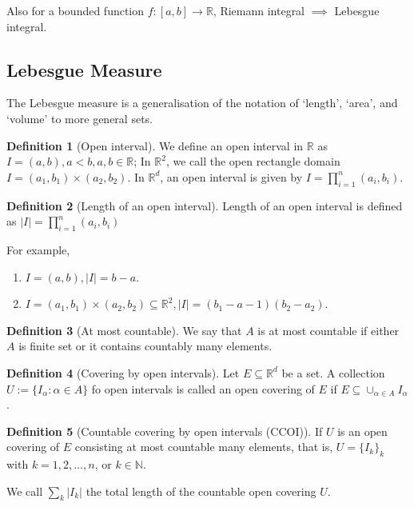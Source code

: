 \documentclass{article}
\theoremstyle{definition}
\newtheorem{definition}{Definition}[section]
\begin{document}
Also for a bounded function $f: [a,b]\to \mathbb{R}$, Riemann integral $\implies$ Lebesgue integral.

\subsection{Lebesgue Measure}

The Lebesgue measure is a generalisation of the notation of `length', `area', and `volume' to more general sets.
\begin{definition}[Open interval]
We define an open interval in $\mathbb{R}$ as $I=(a,b),a<b,a,b \in \mathbb{R}$; In $\mathbb{R}^2$, we call the open rectangle domain $I=(a_1,b_1)\times(a_2,b_2)$. In $\mathbb{R}^d$, an open interval is given by $I=\prod_{i=1}^n(a_i,b_i)$.
\end{definition}
\begin{definition}[Length of an open interval]
Length of an open interval is defined as $|I|=\prod_{i=1}^n(a_i,b_i)$
\end{definition}

For example, 

\begin{enumerate}
	\item $I=(a,b), |I|=b-a$.
	\item $I=(a_1,b_1)\times(a_2,b_2) \subseteq \mathbb{R}^2, |I|=(b_1-a-1)(b_2-a_2)$.
\end{enumerate}


\begin{definition}[At most countable]
We say that $A$ is at most countable if either $A$ is finite set or it contains countably many elements.
\end{definition}

\begin{definition}[Covering by open intervals]
Let $E \subseteq \mathbb{R}^d$ be a set. A collection $U:=\{I_\alpha: \alpha \in A\}$ fo open intervals is called an open covering of $E$ if $E \subseteq \cup_{\alpha \in A}I_\alpha$.
\end{definition}

\begin{definition}[Countable covering by open intervals (CCOI)]
If $U$ is an open covering of $E$ consisting at most countable many elements, that is, $U=\{I_k\}_k$ with $k=1,2,\ldots,n$, or $k\in \mathbb{N}$.
\end{definition}

We call $\sum_k |I_k|$ the total length of the countable open covering $U$.
\end{document}
